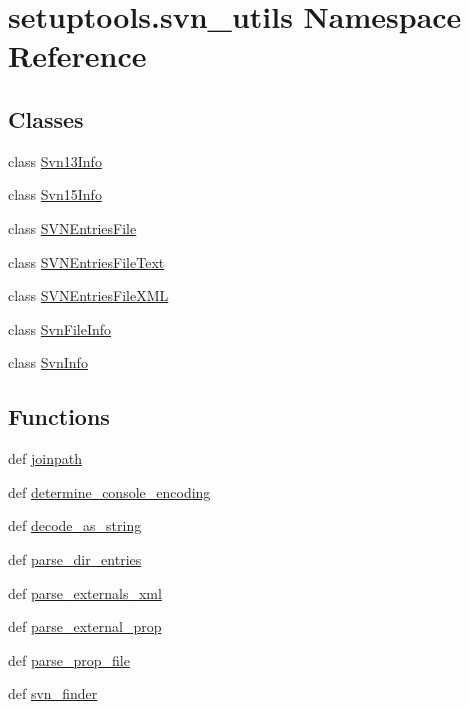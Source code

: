 \hypertarget{namespacesetuptools_1_1svn__utils}{}\section{setuptools.\+svn\+\_\+utils Namespace Reference}
\label{namespacesetuptools_1_1svn__utils}
\subsection*{Classes}
\begin{DoxyCompactItemize}
\item 
class \hyperlink{classsetuptools_1_1svn__utils_1_1Svn13Info}{Svn13\+Info}
\item 
class \hyperlink{classsetuptools_1_1svn__utils_1_1Svn15Info}{Svn15\+Info}
\item 
class \hyperlink{classsetuptools_1_1svn__utils_1_1SVNEntriesFile}{S\+V\+N\+Entries\+File}
\item 
class \hyperlink{classsetuptools_1_1svn__utils_1_1SVNEntriesFileText}{S\+V\+N\+Entries\+File\+Text}
\item 
class \hyperlink{classsetuptools_1_1svn__utils_1_1SVNEntriesFileXML}{S\+V\+N\+Entries\+File\+X\+M\+L}
\item 
class \hyperlink{classsetuptools_1_1svn__utils_1_1SvnFileInfo}{Svn\+File\+Info}
\item 
class \hyperlink{classsetuptools_1_1svn__utils_1_1SvnInfo}{Svn\+Info}
\end{DoxyCompactItemize}
\subsection*{Functions}
\begin{DoxyCompactItemize}
\item 
def \hyperlink{namespacesetuptools_1_1svn__utils_a41753e411f3577b4d80b174fd6add07c}{joinpath}
\item 
def \hyperlink{namespacesetuptools_1_1svn__utils_a48521e6474cbbd6f013adc2ea5d4e58f}{determine\+\_\+console\+\_\+encoding}
\item 
def \hyperlink{namespacesetuptools_1_1svn__utils_a27ea0c46a4cecc225e7c3d2a185c831a}{decode\+\_\+as\+\_\+string}
\item 
def \hyperlink{namespacesetuptools_1_1svn__utils_a96f6dad94b5cc99c4fb965e3fc03a1cc}{parse\+\_\+dir\+\_\+entries}
\item 
def \hyperlink{namespacesetuptools_1_1svn__utils_af1eb58dadfa2ec458c26bf66fe026a12}{parse\+\_\+externals\+\_\+xml}
\item 
def \hyperlink{namespacesetuptools_1_1svn__utils_aebe8420008d2071f93dfe62e001a600b}{parse\+\_\+external\+\_\+prop}
\item 
def \hyperlink{namespacesetuptools_1_1svn__utils_a8847fb41c6f7f8b7497c14cea65f4cac}{parse\+\_\+prop\+\_\+file}
\item 
def \hyperlink{namespacesetuptools_1_1svn__utils_a42a3a601d812c7c8d2d9efd9b637da76}{svn\+\_\+finder}
\end{DoxyCompactItemize}
